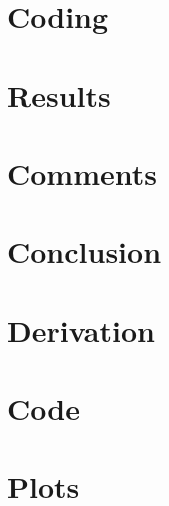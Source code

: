\documentclass{article}
\begin{document}
\section{Coding}
\section{Results}
\section{Comments}
\section{Conclusion}


\appendix
\section{Derivation}
\section{Code}
\section{Plots}
\end{document}
